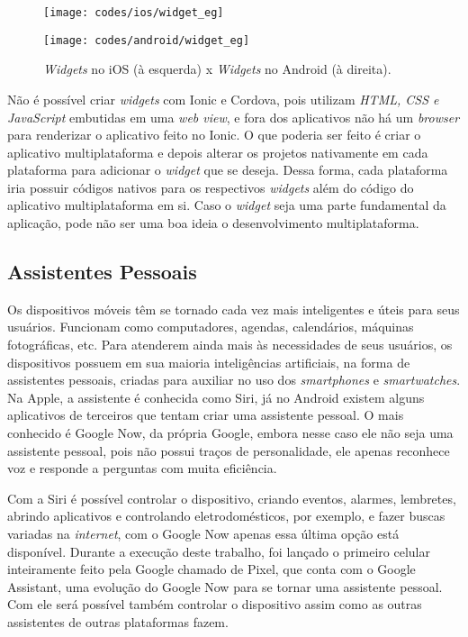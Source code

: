 \begin{figure}[H]
	\centering
	\begin{minipage}{.5\textwidth}
		\centering
		\texttt{[image: codes/ios/widget\_eg]}
	\end{minipage}%
	\begin{minipage}{.5\textwidth}
		\centering
		\texttt{[image: codes/android/widget\_eg]}
	\end{minipage}
\caption[\textit{Widgets} no iOS (à esquerda) x \textit{Widgets} no Android (à direita).]{\textit{Widgets} no iOS (à esquerda) x \textit{Widgets} no Android (à direita).}
\label{fig:widgets_sample}
\end{figure}

Não é possível criar \textit{widgets} com Ionic e Cordova, pois utilizam \textit{HTML, CSS e JavaScript} embutidas em uma \textit{web view}, e fora dos aplicativos não há um \textit{browser} para renderizar o aplicativo 
feito no Ionic. O que poderia ser feito é criar o aplicativo multiplataforma e depois alterar os projetos nativamente em cada plataforma para adicionar o \textit{widget} que se deseja. Dessa forma, cada plataforma iria 
possuir códigos nativos para os respectivos \textit{widgets} além do código do aplicativo multiplataforma em si. Caso o \textit{widget} seja uma parte fundamental da aplicação, pode não ser uma boa ideia o 
desenvolvimento multiplataforma. 

\subsection{Assistentes Pessoais} \label{subsec:siri}
Os dispositivos móveis têm se tornado cada vez mais inteligentes e úteis para seus usuários. Funcionam como computadores, agendas, calendários, máquinas fotográficas, etc. Para atenderem ainda mais às necessidades de 
seus usuários, os dispositivos possuem em sua maioria inteligências artificiais, na forma de assistentes pessoais, criadas para auxiliar no uso dos \textit{smartphones} e \textit{smartwatches}. 
Na Apple, a assistente é conhecida como Siri, já no Android existem alguns aplicativos de terceiros que tentam criar uma assistente pessoal. O mais conhecido é Google Now, da própria Google, 
embora nesse caso ele não seja uma assistente pessoal, pois não possui traços de personalidade, ele apenas reconhece voz e responde a perguntas com muita eficiência.

Com a Siri é possível controlar o dispositivo, criando eventos, alarmes, lembretes, abrindo aplicativos e controlando eletrodomésticos, por exemplo, e fazer buscas variadas na \textit{internet}, com o Google Now 
apenas essa última opção está disponível. Durante a execução deste trabalho, foi lançado o primeiro celular inteiramente feito pela Google chamado de Pixel, que conta com o Google Assistant, uma evolução do Google Now 
para se tornar uma assistente pessoal. Com ele será possível também controlar o dispositivo assim como as outras assistentes de outras plataformas fazem. 

